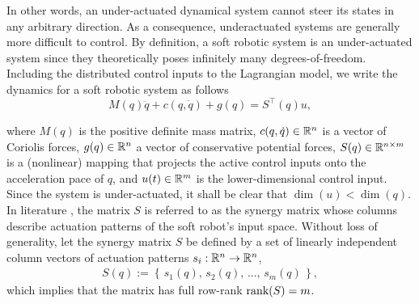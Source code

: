 \noindent In other words, an under-actuated dynamical system cannot steer its states in any arbitrary direction. As a consequence, underactuated systems are generally more difficult to control. By definition, a soft robotic system is an under-actuated system since they theoretically poses infinitely many degrees-of-freedom. Including the distributed control inputs to the Lagrangian model, we write the dynamics for a soft robotic system as follows
\begin{equation}
M(q)\ddot{q} + c(q,\dot{q}) + g(q)= S^\top(q) u,
\end{equation}

\noindent where $M(q)$ is the positive definite mass matrix, $c(q,\dot{q})\in \mathbb{R}^{n}$ is a vector of Coriolis forces, $g(q)\in \mathbb{R}^{n}$ a vector of conservative potential forces, $S(q) \in \mathbb{R}^{n\times m}$ is a (nonlinear) mapping that projects the active control inputs onto the acceleration pace of ${q}$, and $u(t) \in \mathbb{R}^{m}$ is the lower-dimensional control input. Since the system is under-actuated, it shall be clear that $\dim(u) < \dim(q)$. In literature \cite{Santina2019}, the matrix $S$ is referred to as the synergy matrix whose columns describe actuation patterns of the soft robot's input space. Without loss of generality, let the synergy matrix $S$ be defined by a set of linearly independent column vectors of actuation patterns $s_i: \mathbb{R}^n \to \mathbb{R}^n$,
\begin{align}
S(q) := \left\{\,s_1(q),\,s_2(q),\,...,\,s_m(q)\,\right\}, 
\end{align}
which implies that the matrix has full row-rank $\textnormal{rank}(S) = m$. 

